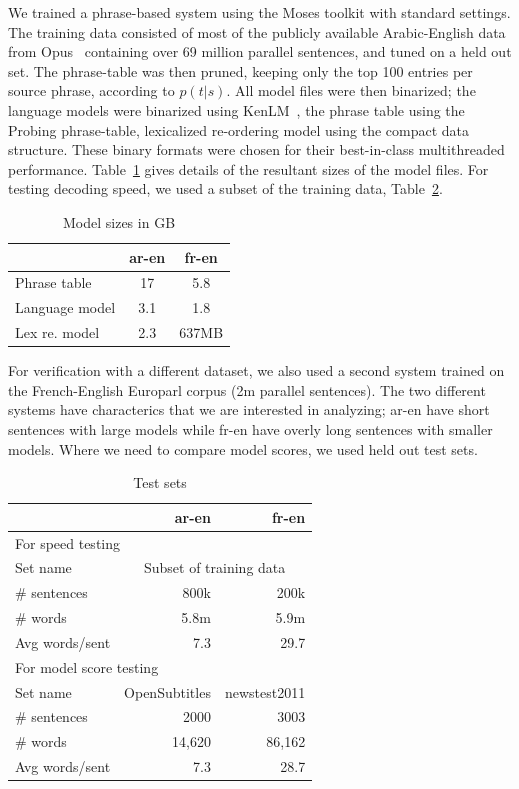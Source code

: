 \documentclass[11pt]{article}
\begin{document}
We trained a phrase-based system using the Moses toolkit with standard settings. The training data consisted of most of the publicly available Arabic-English data from Opus~\cite{tiedemann2012parallel} containing over 69 million parallel sentences, and tuned on a held out set. The phrase-table was then pruned, keeping only the top 100 entries per source phrase, according to $p(t|s)$. All model files were then binarized; the language models were binarized using KenLM~\cite{Heafield-kenlm}, the phrase table using the Probing phrase-table, lexicalized re-ordering model using the compact data structure. These binary formats were chosen for their best-in-class multithreaded performance. Table~\ref{tab:model-files} gives details of the resultant sizes of the model files. For testing decoding speed, we used a subset of the training data, Table~\ref{tab:test-sets}. 
\begin{table}[h]
\begin{center}
\begin{tabular}{|l|c|c|} \hline
		& ar-en	& fr-en \\ \hline
Phrase table  	& 17 	& 5.8 \\
Language model 	& 3.1  	& 1.8 \\ 
Lex re. model	& 2.3	& 637MB \\ \hline
\end{tabular}
\end{center}
\caption{Model sizes in GB}
\label{tab:model-files}
\end{table}

For verification with a different dataset, we also used a second system trained on the French-English Europarl corpus (2m parallel sentences). The two different systems have characterics that we are interested in analyzing; ar-en have short sentences with large models while fr-en have overly long sentences with smaller models. Where we need to compare model scores, we used held out test sets.

\begin{table}[h]
\begin{center}
\small
\begin{tabular}{|l|r|r|} \hline
		& ar-en		& fr-en \\ \hline
\multicolumn{3}{|l|}{For speed testing} \\ \hline
Set name	& \multicolumn{2}{|c|}{Subset of training data} \\
\# sentences  	& 800k 		& 200k \\
\# words 	& 5.8m 		& 5.9m \\ 
Avg words/sent	& 7.3		& 29.7 \\ \hline
\multicolumn{3}{|l|}{For model score testing} \\ \hline
Set name	& OpenSubtitles	& newstest2011 \\
\# sentences  	& 2000 		& 3003 \\
\# words 	& 14,620 	& 86,162 \\ 
Avg words/sent	& 7.3		& 28.7 \\ \hline
\end{tabular}
\end{center}
\caption{Test sets}
\label{tab:test-sets}
\end{table}
\end{document}
